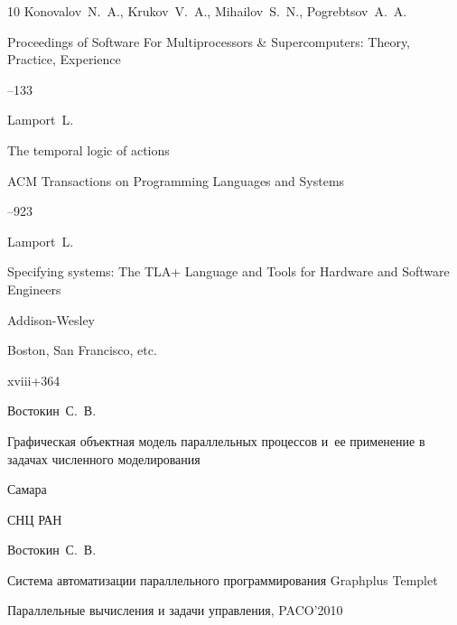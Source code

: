 \begin{thebibliography}{10}
\by Konovalov~N.~A., Krukov~V.~A., Mihailov~S.~N., Pogrebtsov~A.~A.

\inbook Proceedings of Software For Multiprocessors \& Supercomputers:   Theory, Practice, Experience


--133






\by Lamport~L.

\paper The temporal logic of actions

\jour ACM Transactions on Programming Languages and Systems



–923








\by Lamport~L.

\book Specifying systems: The TLA+ Language and Tools for Hardware and Software Engineers 

\publ Addison-Wesley

\publaddr Boston, San Francisco, etc.


\totalpages xviii+364






\by Востокин~С.~В.

\book Графическая объектная модель параллельных процессов и~ее применение в задачах численного моделирования

\publaddr Самара

\publ СНЦ РАН






\by Востокин~С.~В.

\paper Система автоматизации параллельного программирования Graphplus Templet

\inbook Параллельные вычисления и задачи управления, \rm PACO’2010


\end{thebibliography}
